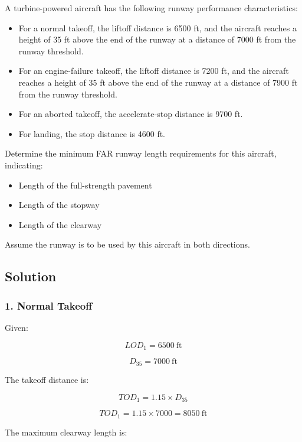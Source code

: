 \documentclass{KPS_assignment}
\begin{document}
A turbine-powered aircraft has the following runway performance characteristics:

\begin{itemize}
    \item For a normal takeoff, the liftoff distance is 6500 ft, and the aircraft reaches a height of 35 ft above the end of the runway at a distance of 7000 ft from the runway threshold.
    
    \item For an engine-failure takeoff, the liftoff distance is 7200 ft, and the aircraft reaches a height of 35 ft above the end of the runway at a distance of 7900 ft from the runway threshold.
    
    \item For an aborted takeoff, the accelerate-stop distance is 9700 ft.
    
    \item For landing, the stop distance is 4600 ft.
\end{itemize}

Determine the minimum FAR runway length requirements for this aircraft, indicating:

\begin{itemize}
    \item Length of the full-strength pavement
    \item Length of the stopway
    \item Length of the clearway
\end{itemize}

Assume the runway is to be used by this aircraft in both directions.

\subsection*{Solution}

\subsubsection*{1. Normal Takeoff}

Given:

\[
LOD_1 = 6500 \ \text{ft}
\]

\[
D_{35} = 7000 \ \text{ft}
\]

The takeoff distance is:

\[
TOD_1 = 1.15 \times D_{35}
\]

\[
TOD_1 = 1.15 \times 7000 = 8050 \ \text{ft}
\]

The maximum clearway length is:
\end{document}
